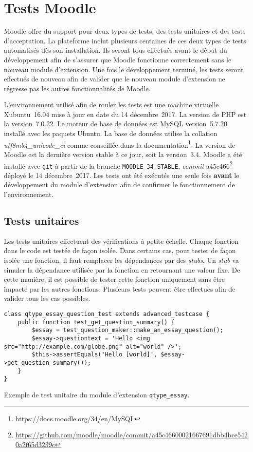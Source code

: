 \chapter{Tests Moodle}
Moodle offre du support pour deux types de tests: des tests unitaires et des tests d'acceptation.
La plateforme inclut plusieurs centaines de ces deux types de tests automatis\'es d\`es son installation.
Ils seront tous effectu\'es avant le d\'ebut du d\'eveloppement afin de s'assurer que Moodle fonctionne correctement sans le nouveau module d'extension.
Une fois le d\'eveloppement termin\'e, les tests seront effectu\'es de nouveau afin de valider que le nouveau module d'extension ne r\'egresse pas les autres fonctionnalit\'es de Moodle.

L'environnement utilis\'e afin de rouler les tests est une machine virtuelle Xubuntu~16.04 mise \`a jour en date du 14 d\'ecembre~2017.
La version de PHP est la version~7.0.22.
Le moteur de base de donn\'ees est MySQL version~5.7.20 install\'e avec les paquets Ubuntu.
La base de donn\'ees utilise la collation \textit{utf8mb4\_unicode\_ci} comme conseill\'ee dans la documentation\footnote{\url{https://docs.moodle.org/34/en/MySQL}}.
La version de Moodle est la derni\`ere version stable \`a ce jour, soit la version~3.4.
Moodle a \'et\'e install\'e avec \texttt{git} \`a partir de la branche \texttt{MOODLE\_34\_STABLE}, \textit{commit} a45c466\footnote{\url{https://github.com/moodle/moodle/commit/a45c46600021667691dbb4bce5420a2f65d3239c}} d\'eploy\'e le 14 d\'ecembre~2017.
Les tests ont \'et\'e ex\'ecut\'es une seule fois \textbf{avant} le d\'eveloppement du module d'extension afin de confirmer le fonctionnement de l'environnement.

\section{Tests unitaires}
Les tests unitaires effectuent des v\'erifications \`a petite \'echelle.
Chaque fonction dans le code est test\'ee de fa\c{c}on isol\'ee.
Dans certains cas, pour tester de fa\c{c}on isol\'ee une fonction, il faut remplacer les d\'ependances par des \textit{stubs}.
Un \textit{stub} va simuler la d\'ependance utilis\'ee par la fonction en retournant une valeur fixe.
De cette mani\`ere, il est possible de tester cette fonction uniquement sans \^etre impact\'e par les autres fonctions.
Plusieurs tests peuvent \^etre effectu\'es afin de valider tous les cas possibles. \cite{tremblay16}

\begin{lstfloat}[htbp]
\begin{lstlisting}[frame=l]
class qtype_essay_question_test extends advanced_testcase {
    public function test_get_question_summary() {
        $essay = test_question_maker::make_an_essay_question();
        $essay->questiontext = 'Hello <img src="http://example.com/globe.png" alt="world" />';
        $this->assertEquals('Hello [world]', $essay->get_question_summary());
    }
}
\end{lstlisting}
\caption{Exemple de test unitaire du module d'extension \texttt{qtype\_essay}.}
\label{code:unittest}
\end{lstfloat}

